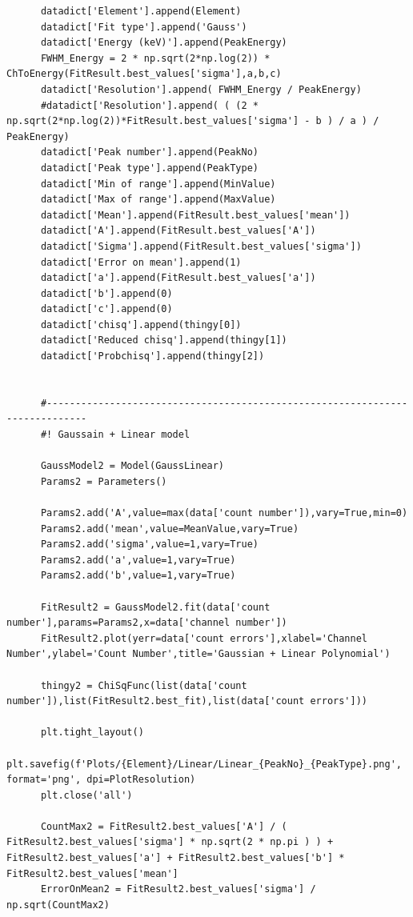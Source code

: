 \documentclass[11pt,a4paper]{article}
\begin{document}
\begin{verbatim}
      datadict['Element'].append(Element)
      datadict['Fit type'].append('Gauss')
      datadict['Energy (keV)'].append(PeakEnergy)
      FWHM_Energy = 2 * np.sqrt(2*np.log(2)) * ChToEnergy(FitResult.best_values['sigma'],a,b,c)
      datadict['Resolution'].append( FWHM_Energy / PeakEnergy)
      #datadict['Resolution'].append( ( (2 * np.sqrt(2*np.log(2))*FitResult.best_values['sigma'] - b ) / a ) / PeakEnergy)
      datadict['Peak number'].append(PeakNo)
      datadict['Peak type'].append(PeakType)
      datadict['Min of range'].append(MinValue)
      datadict['Max of range'].append(MaxValue)
      datadict['Mean'].append(FitResult.best_values['mean'])
      datadict['A'].append(FitResult.best_values['A'])
      datadict['Sigma'].append(FitResult.best_values['sigma'])
      datadict['Error on mean'].append(1)
      datadict['a'].append(FitResult.best_values['a'])
      datadict['b'].append(0)
      datadict['c'].append(0)
      datadict['chisq'].append(thingy[0])
      datadict['Reduced chisq'].append(thingy[1])
      datadict['Probchisq'].append(thingy[2])

      
      #-----------------------------------------------------------------------------
      #! Gaussain + Linear model 

      GaussModel2 = Model(GaussLinear)
      Params2 = Parameters()

      Params2.add('A',value=max(data['count number']),vary=True,min=0)
      Params2.add('mean',value=MeanValue,vary=True)
      Params2.add('sigma',value=1,vary=True)
      Params2.add('a',value=1,vary=True)
      Params2.add('b',value=1,vary=True)

      FitResult2 = GaussModel2.fit(data['count number'],params=Params2,x=data['channel number'])
      FitResult2.plot(yerr=data['count errors'],xlabel='Channel Number',ylabel='Count Number',title='Gaussian + Linear Polynomial')

      thingy2 = ChiSqFunc(list(data['count number']),list(FitResult2.best_fit),list(data['count errors']))

      plt.tight_layout()
      plt.savefig(f'Plots/{Element}/Linear/Linear_{PeakNo}_{PeakType}.png', format='png', dpi=PlotResolution)
      plt.close('all')

      CountMax2 = FitResult2.best_values['A'] / ( FitResult2.best_values['sigma'] * np.sqrt(2 * np.pi ) ) + FitResult2.best_values['a'] + FitResult2.best_values['b'] * FitResult2.best_values['mean']
      ErrorOnMean2 = FitResult2.best_values['sigma'] / np.sqrt(CountMax2)
      

\end{verbatim}
\end{document}
